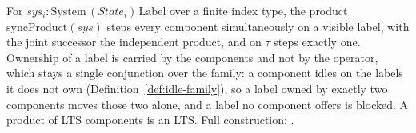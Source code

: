 \begin{definition}
  \label{def:syncproduct}
  \leanok
  For $sys_i : \mathrm{System}\,(State_i)\,\mathrm{Label}$ over a finite index type, the product $\mathrm{syncProduct}(sys)$ steps every component simultaneously on a visible label, with the joint successor the independent product, and on $\tau$ steps exactly one.
  Ownership of a label is carried by the components and not by the operator, which stays a single conjunction over the family: a component idles on the labels it does not own (Definition~\ref{def:idle-family}), so a label owned by exactly two components moves those two alone, and a label no component offers is blocked.
  A product of LTS components is an LTS.
  Full construction: .
\end{definition}
